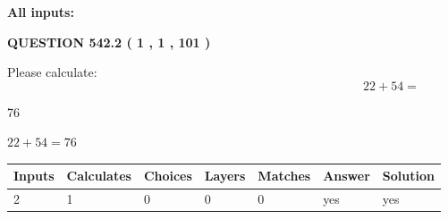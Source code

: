 \documentclass[12pt]{article}
\begin{document}
   
   
   
\noindent{}
   
   
   
   
\noindent\vspace{0.1in}\hspace{-0.08in} {\textbf{\Large{All inputs: }}}
   
   
  
\vspace{0.2in}
  
{\textbf{\Large{QUESTION
542.2 
 ( 1 , 1 , 101 )
}}}
  
  
 
Please calculate:
\begin{equation}
22 +  %
54 = \nonumber
\end{equation}
 
 
 
\noindent{}
 
 

76
 
 
\noindent{}
 
 

 
 
 
\noindent{}
 
 

$ %
22 +  %
54=   %
76$
 
 
\noindent{}
 
 

 
   
   
   
   
\noindent\begin{tabular}{|l|l|l|l|l|l|l|}
 \hline
Inputs & Calculates & Choices & Layers & Matches & Answer & Solution \\ \hline
 2  & 
 1  & 
 0
  & 
 0  & 
 0  & 
  yes & 
  yes 
  \\ \hline
 \end{tabular}
   
   
   
   
\noindent{}
   
\end{document}
